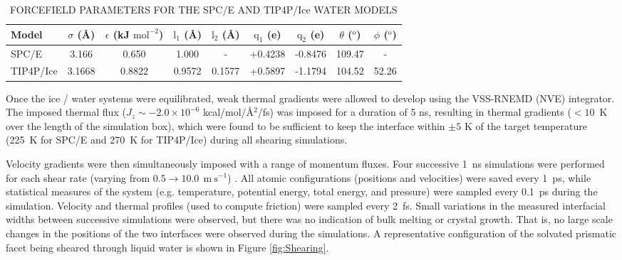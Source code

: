 \begin{table}
\centering
\caption{FORCEFIELD PARAMETERS FOR THE SPC/E AND TIP4P/Ice WATER MODELS}
\label{tab:waterModels}
\begin{tabular}{l|c|c|c|c|c|c|c|c} 
\hline
\hline
  Model &  $\sigma$ (\AA) & $\epsilon$ (kJ $\mathrm{mol}^{-2}$) &
                                                              $\mathrm{l}_{1}$
                                                              (\AA) &
                                                                    $\mathrm{l}_{2}$
                                                                      (\AA)
  & $\mathrm{q}_{1}$ (e) & $\mathrm{q}_{2}$ (e) & $\theta$
                                                  ($^{\mathrm{o}}$) &
                                                                      $\phi$ ($^{\mathrm{o}}$) \\ \hline
  SPC/E & 3.166 & 0.650 & 1.000 & - & +0.4238 & -0.8476 & 109.47 & - \\
  TIP4P/Ice & 3.1668 & 0.8822 & 0.9572 & 0.1577 & +0.5897 & -1.1794 &
  104.52 & 52.26 \\
\hline
\hline
\end{tabular}
\end {table}


Once the ice / water systems were equilibrated, weak thermal gradients
were allowed to develop using the VSS-RNEMD (NVE) integrator. The
imposed thermal flux ($J_z \sim -2.0\times 10^{-6}$
kcal/mol/\AA$^2$/fs) was imposed for a duration of 5 ns, resulting in
thermal gradients ($< 10$~K over the length of the simulation box),
which were found to be sufficient to keep the interface within $\pm 5$
K of the target temperature (225~K for SPC/E and 270~K for TIP4P/Ice)
during all shearing simulations.

Velocity gradients were then simultaneously imposed with a range of
momentum fluxes.  Four successive 1~ns simulations were performed for
each shear rate (varying from
$0.5 \rightarrow 10.0~\mathrm{~m~s}^{-1}$) . All atomic configurations
(positions and velocities) were saved every 1~ps, while statistical
measures of the system (e.g. temperature, potential energy, total
energy, and pressure) were sampled every 0.1~ps during the
simulation. Velocity and thermal profiles (used to compute friction)
were sampled every 2~fs. Small variations in the measured interfacial
widths between successive simulations were observed, but there was no
indication of bulk melting or crystal growth. That is, no large scale
changes in the positions of the two interfaces were observed during
the simulations.  A representative configuration of the solvated
prismatic facet being sheared through liquid water is shown in Figure
\ref{fig:Shearing}.


